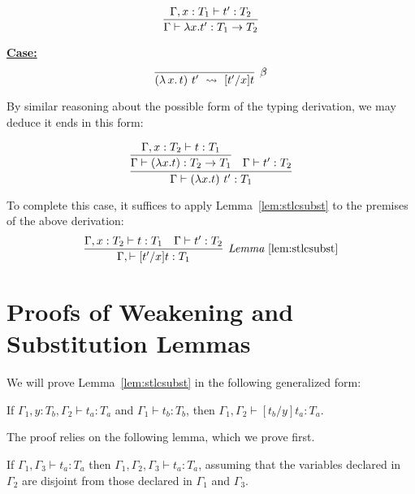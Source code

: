 \documentclass{article}
\providecommand{\betarule}[0]{\infer[\beta]{(\lambda\,x.\, t)\ t'\ \leadsto\ [t'/x]t}
                                {\ }}
\begin{document}
\[
\infer{\Gamma \vdash \lambda x. t' : T_1 \to T_2}
{\Gamma, x:T_1 \vdash t' : T_2}
\]

\noindent \underline{\textbf{Case:}}
\[ 
\betarule
\]

\noindent By similar reasoning about the possible form of the typing derivation, we may deduce
it ends in this form:

\[ 
\infer{\Gamma \vdash (\lambda x.t)\ t' : T_1}
       {\infer{\Gamma \vdash (\lambda x.t) : T_2\to T_1}
              {\Gamma, x : T_2 \vdash t : T_1} & \Gamma \vdash t' : T_2}
\]

\noindent To complete this case, it suffices to apply 
Lemma~\ref{lem:stlcsubst} to the premises of the above derivation:
\[
\infer[\textit{Lemma}~\ref{lem:stlcsubst}]
      {\Gamma,\vdash [t'/x]t:T_1}
      {\Gamma, x : T_2 \vdash t : T_1 & \Gamma \vdash t' : T_2}
\]


\section{Proofs of Weakening and Substitution Lemmas}
\label{sec:stlcsubst}

We will prove Lemma~\ref{lem:stlcsubst} in the following generalized form:
\begin{lemma}[Substitution]
\label{lem:stlcsubsta}
If $\Gamma_1, y:T_b, \Gamma_2 \vdash t_a : T_a$ and $\Gamma_1 \vdash t_b : T_b$, then
$\Gamma_1,\Gamma_2 \vdash [t_b/y]t_a : T_a$.
\end{lemma}

The proof relies on the
following lemma, which we prove first.

\begin{lemma}[Weakening]
\label{lem:stlcweak}
If $\Gamma_1, \Gamma_3 \vdash t_a : T_a$ then $\Gamma_1, \Gamma_2,
\Gamma_3 \vdash t_a : T_a$, assuming that the variables declared in
$\Gamma_2$ are disjoint from those declared in $\Gamma_1$ and
$\Gamma_3$.
\end{lemma}
\end{document}
